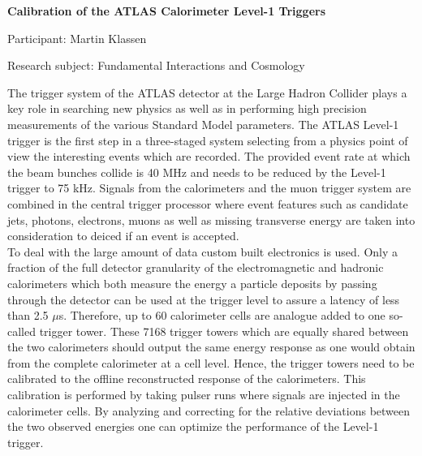\begin{minipage}[t]{1.0\textwidth}

\begin{center}

{{\large\bfseries Calibration of the ATLAS Calorimeter Level-1 Triggers}\par}

\end{center}

{\noindent Participant: Martin Klassen\par} 

{\noindent Research subject: Fundamental Interactions and Cosmology\par}\medskip

\noindent The trigger system of the ATLAS detector at the Large Hadron Collider plays a key role in searching new physics as well as in performing high precision measurements of the various Standard Model parameters. The ATLAS Level-1 trigger is the first step in a three-staged system selecting  from a physics point of view the interesting events which are recorded. The provided event rate at which the beam bunches collide is 40 MHz and needs to be reduced by the Level-1 trigger to 75 kHz. Signals from the calorimeters and the muon trigger system are combined in the central trigger processor where event features such as candidate jets, photons, electrons, muons as well as missing transverse energy are taken into consideration to deiced if an event is accepted. \\
To deal with the large amount of data custom built electronics is used. Only a fraction of the full detector granularity of the electromagnetic and hadronic calorimeters which both measure the energy a particle deposits by passing through the detector can be used at the trigger level to assure a latency of less than 2.5 $\mu$s. Therefore, up to 60 calorimeter cells are analogue added to one so-called trigger tower. These 7168 trigger towers which are equally shared between the two calorimeters should output the same energy response as one would obtain from the complete calorimeter at a cell level. Hence, the trigger towers need to be calibrated to the offline reconstructed response of the calorimeters. This calibration is performed by taking pulser runs where signals are injected in the calorimeter cells. By analyzing and correcting for the relative deviations between the two observed energies one can optimize the performance of the Level-1 trigger.\par\end{minipage}

